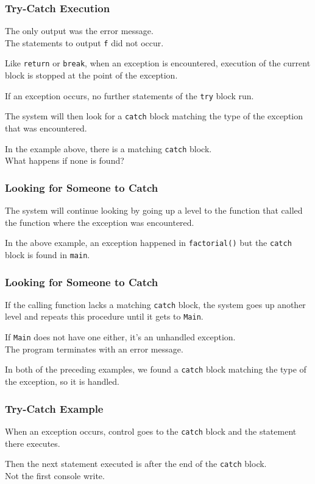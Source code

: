 \begin{frame}
\frametitle{Try-Catch Execution}

The only output was the error message.\\
\quad The statements to output \texttt{f} did not occur.

Like \texttt{return} or \texttt{break}, when an exception is encountered, execution of the current block is stopped at the point of the exception.

If an exception occurs, no further statements of the \texttt{try} block run.

The system will then look for a \texttt{catch} block matching the type of the exception that was encountered.

In the example above, there is a matching \texttt{catch} block.\\
\quad What happens if none is found?

\end{frame}

\begin{frame}[fragile]
\frametitle{Looking for Someone to Catch}

The system will continue looking by going up a level to the function that called the function where the exception was encountered.

In the above example, an exception happened in \texttt{factorial()} but the \texttt{catch} block is found in \texttt{main}.

\end{frame}

\begin{frame}
\frametitle{Looking for Someone to Catch}

If the calling function lacks a matching \texttt{catch} block, the system goes up another level and repeats this procedure until it gets to \texttt{Main}.

If \texttt{Main} does not have one either, it's an unhandled exception.\\
\quad The program terminates with an error message.

In both of the preceding examples, we found a \texttt{catch} block matching the type of the exception, so it is handled.

\end{frame}

\begin{frame}[fragile]
\frametitle{Try-Catch Example}
When an exception occurs, control goes to the \texttt{catch} block and the statement there executes.

Then the next statement executed is after the end of the \texttt{catch} block.\\
\quad Not the first console write.
\end{frame}


